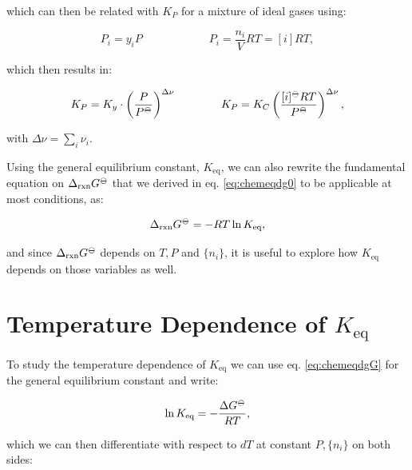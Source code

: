 \documentclass[
  9pt,
]{extbook}
\theoremstyle{definition}
\theoremstyle{definition}
\theoremstyle{definition}
\theoremstyle{remark}
\begin{document}
which can then be related with \(K_P\) for a mixture of ideal gases using:

\begin{equation}
P_i = y_i P \qquad \qquad \qquad P_i=\frac{n_i}{V}RT=[i]RT,
\label{eq:kxkcdef2}
\end{equation}

which then results in:

\begin{equation}
K_P = K_y\cdot \left(\frac{P}{P^{-\kern-6pt{\ominus}\kern-6pt-}}\right)^{\Delta \nu} \qquad \qquad K_P = K_C \left( \frac{[i]^{-\kern-6pt{\ominus}\kern-6pt-}RT}{P^{-\kern-6pt{\ominus}\kern-6pt-}} \right)^{\Delta \nu},
\label{eq:kxkcdef3}
\end{equation}

with \(\Delta \nu =\sum_i \nu_i\).

Using the general equilibrium constant, \(K_{\text{eq}}\), we can also rewrite the fundamental equation on \(\Delta_{\text{rxn}} G^{-\kern-6pt{\ominus}\kern-6pt-}\) that we derived in eq. \eqref{eq:chemeqdg0} to be applicable at most conditions, as:

\begin{equation}
\Delta_{\text{rxn}} G^{-\kern-6pt{\ominus}\kern-6pt-}= - RT \ln K_{\text{eq}},
\label{eq:chemeqdgG}
\end{equation}

and since \(\Delta_{\text{rxn}} G^{-\kern-6pt{\ominus}\kern-6pt-}\) depends on \(T,P\) and \(\{n_i\}\), it is useful to explore how \(K_{\text{eq}}\) depends on those variables as well.

\hypertarget{temperature-dependence-of-k_texteq}{%
\section{\texorpdfstring{Temperature Dependence of \(K_{\text{eq}}\)}{Temperature Dependence of K\_\{\textbackslash text\{eq\}\}}}\label{temperature-dependence-of-k_texteq}}

To study the temperature dependence of \(K_{\text{eq}}\) we can use eq. \eqref{eq:chemeqdgG} for the general equilibrium constant and write:

\begin{equation}
\ln K_{\text{eq}} = -\frac{\Delta G^{-\kern-6pt{\ominus}\kern-6pt-}}{RT},
\label{eq:kptemp1}
\end{equation}

which we can then differentiate with respect to \(dT\) at constant \(P,\{n_i\}\) on both sides:
\end{document}
